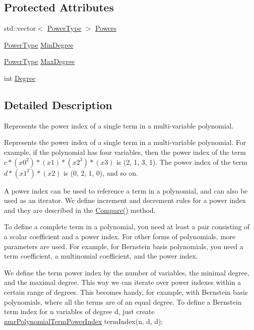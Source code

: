 \subsection*{Protected Attributes}
\begin{DoxyCompactItemize}
\item 
std\-::vector$<$ \hyperlink{classnmr_polynomial_term_power_index_a2eec01c3a2c3f56f47982ceffd8e36ed}{Power\-Type} $>$ \hyperlink{classnmr_polynomial_term_power_index_a05f4d771e733168086d285e1cf0e1d1e}{Powers}
\item 
\hyperlink{classnmr_polynomial_term_power_index_a2eec01c3a2c3f56f47982ceffd8e36ed}{Power\-Type} \hyperlink{classnmr_polynomial_term_power_index_a16ac64643c0802d0efb4bf3f617d0964}{Min\-Degree}
\item 
\hyperlink{classnmr_polynomial_term_power_index_a2eec01c3a2c3f56f47982ceffd8e36ed}{Power\-Type} \hyperlink{classnmr_polynomial_term_power_index_a9b831b9f652cd6053941aff903ddb024}{Max\-Degree}
\item 
int \hyperlink{classnmr_polynomial_term_power_index_a2794eed1b12205604c2d2d5806279368}{Degree}
\end{DoxyCompactItemize}


\subsection{Detailed Description}
Represents the power index of a single term in a multi-\/variable polynomial. 

Represents the power index of a single term in a multi-\/variable polynomial. For example, if the polynomial has four variables, then the power index of the term $c * (x0^2)*(x1)*(x2^3)*(x3)$ is (2, 1, 3, 1). The power index of the term $d * (x1^2)*(x2)$ is (0, 2, 1, 0), and so on.

A power index can be used to reference a term in a polynomial, and can also be used as an iterator. We define increment and decrement rules for a power index and they are described in the \hyperlink{classnmr_polynomial_term_power_index_ab2d0e6ddf4ba6552fe41a7f6f36060cf}{Compare()} method.

To define a complete term in a polynomial, you need at least a pair consisting of a scalar coefficient and a power index. For other forms of polynomials, more parameters are used. For example, for Bernstein basis polynomials, you need a term coefficient, a multinomial coefficient, and the power index.

We define the term power index by the number of variables, the minimal degree, and the maximal degree. This way we can iterate over power indexes within a certain range of degrees. This becomes handy, for example, with Bernstein basis polynomials, where all the terms are of an equal degree. To define a Bernstein term index for n variables of degree d, just create \hyperlink{classnmr_polynomial_term_power_index}{nmr\-Polynomial\-Term\-Power\-Index} term\-Index(n, d, d);

